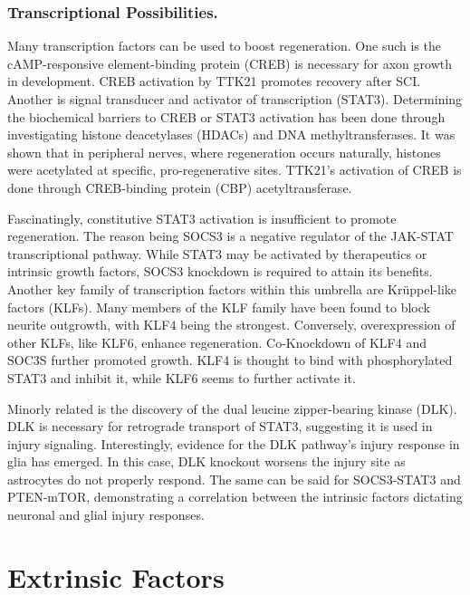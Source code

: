 \documentclass[12pt]{report}
\begin{document}
\subsubsection{Transcriptional Possibilities.}

Many transcription factors can be used to boost regeneration. One such is the cAMP-responsive element-binding protein (CREB) is necessary for axon growth in development. CREB activation by TTK21 promotes recovery after SCI. Another is signal transducer and activator of transcription (STAT3). Determining the biochemical barriers to CREB or STAT3 activation has been done through investigating histone deacetylases (HDACs) and DNA methyltransferases. It was shown that in peripheral nerves, where regeneration occurs naturally, histones were acetylated at specific, pro-regenerative sites. TTK21's activation of CREB is done through CREB-binding protein (CBP) acetyltransferase.\newline

Fascinatingly, constitutive STAT3 activation is insufficient to promote regeneration. The reason being SOCS3 is a negative regulator of the JAK-STAT transcriptional pathway. While STAT3 may be activated by therapeutics or intrinsic growth factors, SOCS3 knockdown is required to attain its benefits. Another key family of transcription factors within this umbrella are Kr\"{u}ppel-like factors (KLFs). Many members of the KLF family have been found to block neurite outgrowth, with KLF4 being the strongest. Conversely, overexpression of other KLFs, like KLF6, enhance regeneration. Co-Knockdown of KLF4 and SOC3S further promoted growth. KLF4 is thought to bind with phosphorylated STAT3 and inhibit it, while KLF6 seems to further activate it.\newline

Minorly related is the discovery of the dual leucine zipper-bearing kinase (DLK). DLK is necessary for retrograde transport of STAT3, suggesting it is used in injury signaling. Interestingly, evidence for the DLK pathway's injury response in glia has emerged. In this case, DLK knockout worsens the injury site as astrocytes do not properly respond. The same can be said for SOCS3-STAT3 and PTEN-mTOR, demonstrating a correlation between the intrinsic factors dictating neuronal and glial injury responses. 


\section{Extrinsic Factors}
\end{document}
